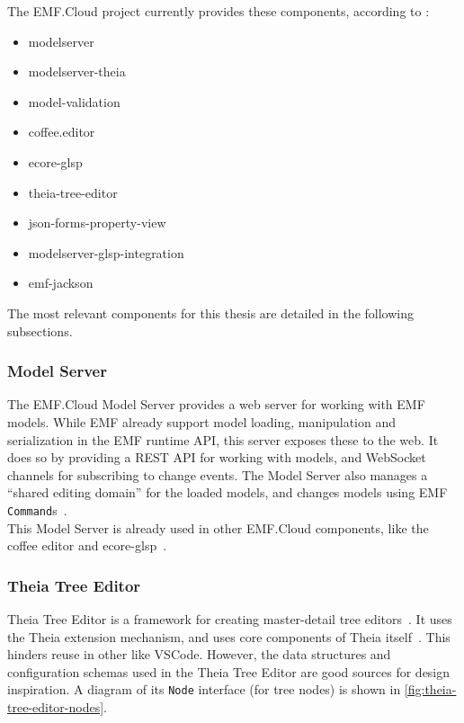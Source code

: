 The EMF.Cloud project currently provides these components, according to \cite{tobiasortmayrEclipseemfcloudEmfcloud2021}:

\begin{itemize}
  \item modelserver
  \item modelserver-theia
  \item model-validation
  \item coffee.editor
  \item ecore-glsp
  \item theia-tree-editor
  \item json-forms-property-view
  \item modelserver-glsp-integration
  \item emf-jackson
\end{itemize}

The most relevant components for this thesis are detailed in the following subsections.

\subsubsection{Model Server}
The EMF.Cloud Model Server provides a web server for working with \acrshort{EMF} models.
While \acrshort{EMF} already support model loading, manipulation and serialization in the \acrshort{EMF} runtime \acrshort{API}, this server exposes these to the web.
It does so by providing a \gls{REST} \acrshort{API} for working with models, and \gls{WebSocket} channels for subscribing to change events.
The Model Server also manages a ``shared editing domain'' for the loaded models, and changes models using \acrshort{EMF} \texttt{Command}s~\cite{foundationEMFCloud}.\\

This Model Server is already used in other EMF.Cloud components, like the coffee editor and ecore-glsp~\cite{eugenneufeldEclipseemfcloudCoffeeeditor2021,ninadoschekEclipseemfcloudEcoreglsp2021}.

\subsubsection{Theia Tree Editor}\label{par:theia-tree-editor}
Theia Tree Editor is a framework for creating master-detail tree editors~\cite{foundationEMFCloud}.
It uses the Theia extension mechanism, and uses core components of \gls{Theia} itself~\cite{rekstadModelingEnvironmentCloud2020}.
This hinders reuse in other  like \gls{VSCode}.
However, the data structures and configuration schemas used in the Theia Tree Editor are good sources for design inspiration.
A diagram of its \texttt{Node} interface (for tree nodes) is shown in \cref{fig:theia-tree-editor-nodes}.



